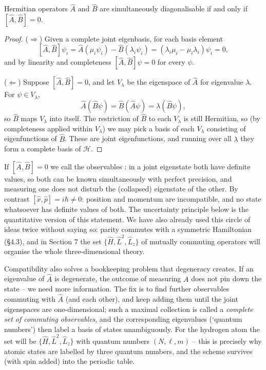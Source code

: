 \begin{theorem}
    Hermitian operators $\hat{A}$ and $\hat{B}$ are simultaneously diagonalisable if and only if $[\hat{A}, \hat{B}] = 0$.
\end{theorem}
\begin{proof}
    ($\Rightarrow$) Given a complete joint eigenbasis, for each basis element
    $$
    [\hat{A}, \hat{B}]\psi_i = \hat{A}(\mu_i \psi_i) - \hat{B}(\lambda_i \psi_i) = (\lambda_i \mu_i - \mu_i \lambda_i)\psi_i = 0,
    $$
    and by linearity and completeness $[\hat{A}, \hat{B}]\psi = 0$ for every $\psi$.

    ($\Leftarrow$) Suppose $[\hat{A}, \hat{B}] = 0$, and let $V_\lambda$ be the eigenspace of $\hat{A}$ for eigenvalue $\lambda$. For $\psi \in V_\lambda$,
    $$
    \hat{A}(\hat{B}\psi) = \hat{B}(\hat{A}\psi) = \lambda (\hat{B} \psi),
    $$
    so $\hat{B}$ maps $V_\lambda$ into itself. The restriction of $\hat{B}$ to each $V_\lambda$ is still Hermitian, so (by completeness applied within $V_\lambda$) we may pick a basis of each $V_\lambda$ consisting of eigenfunctions of $\hat{B}$. These are joint eigenfunctions, and running over all $\lambda$ they form a complete basis of $\mathcal{H}$.
\end{proof}

If $[\hat{A}, \hat{B}] = 0$ we call the observables : in a joint eigenstate both have definite values, so both can be known simultaneously with perfect precision, and measuring one does not disturb the (collapsed) eigenstate of the other. By contrast $[\hat{x}, \hat{p}] = i\hbar \neq 0$: position and momentum are incompatible, and no state whatsoever has definite values of both. The uncertainty principle below is the quantitative version of this statement. We have also already used this circle of ideas twice without saying so: parity commutes with a symmetric Hamiltonian (\S 4.3), and in Section 7 the set $\{\hat{H}, \hat{L}^2, \hat{L}_z\}$ of mutually commuting operators will organise the whole three-dimensional theory.

\begin{remark}
    Compatibility also solves a bookkeeping problem that degeneracy creates. If an eigenvalue of $\hat{A}$ is degenerate, the outcome of measuring $A$ does not pin down the state -- we need more information. The fix is to find further observables commuting with $\hat{A}$ (and each other), and keep adding them until the joint eigenspaces are one-dimensional; such a maximal collection is called a \emph{complete set of commuting observables}, and the corresponding eigenvalues (`quantum numbers') then label a basis of states unambiguously. For the hydrogen atom the set will be $\{\hat H, \hat L^2, \hat L_z\}$ with quantum numbers $(N, \ell, m)$ -- this is precisely why atomic states are labelled by three quantum numbers, and the scheme survives (with spin added) into the periodic table.
\end{remark}

